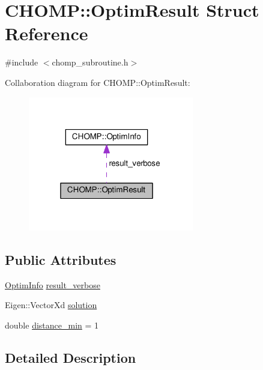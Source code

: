 \hypertarget{struct_c_h_o_m_p_1_1_optim_result}{}\section{C\+H\+O\+MP\+:\+:Optim\+Result Struct Reference}
\label{struct_c_h_o_m_p_1_1_optim_result}


{\ttfamily \#include $<$chomp\+\_\+subroutine.\+h$>$}



Collaboration diagram for C\+H\+O\+MP\+:\+:Optim\+Result\+:\nopagebreak
\begin{figure}[H]
\begin{center}
\leavevmode
\includegraphics[width=205pt]{struct_c_h_o_m_p_1_1_optim_result__coll__graph}
\end{center}
\end{figure}
\subsection*{Public Attributes}
\begin{DoxyCompactItemize}
\item 
\hyperlink{struct_c_h_o_m_p_1_1_optim_info}{Optim\+Info} \hyperlink{struct_c_h_o_m_p_1_1_optim_result_aa4314b8ae0ca38f9bad7fd8c7e1f9492}{result\+\_\+verbose}
\item 
Eigen\+::\+Vector\+Xd \hyperlink{struct_c_h_o_m_p_1_1_optim_result_ae85f14f34c231bb2f5767553b6771f9c}{solution}
\item 
double \hyperlink{struct_c_h_o_m_p_1_1_optim_result_af32c849b25b8c323b3ae0a3f4236d881}{distance\+\_\+min} = 1
\end{DoxyCompactItemize}


\subsection{Detailed Description}


